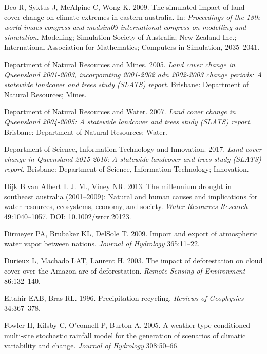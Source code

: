 \documentclass[fleqn,10pt,lineno]{wlpeerj} %
\theoremstyle{definition}
\theoremstyle{definition}
\theoremstyle{definition}
\theoremstyle{remark}
\begin{document}
\hypertarget{ref-Deo2009}{}
Deo R, Syktus J, McAlpine C, Wong K. 2009. The simulated impact of land
cover change on climate extremes in eastern australia. In:
\emph{Proceedings of the 18th world imacs congress and modsim09
international congress on modelling and simulation}. Modelling;
Simulation Society of Australia; New Zealand Inc.; International
Association for Mathematics; Computers in Simulation, 2035--2041.

\hypertarget{ref-SLATS2001}{}
Department of Natural Resources and Mines. 2005. \emph{Land cover change
in Queensland 2001-2003, incorporating 2001-2002 adn 2002-2003 change
periods: A statewide landcover and trees study (SLATS) report}.
Brisbane: Department of Natural Resources; Mines.

\hypertarget{ref-SLATS2004}{}
Department of Natural Resources and Water. 2007. \emph{Land cover change
in Queensland 2004-2005: A statewide landcover and trees study (SLATS)
report}. Brisbane: Department of Natural Resources; Water.

\hypertarget{ref-SLATS2017}{}
Department of Science, Information Technology and Innovation. 2017.
\emph{Land cover change in Queensland 2015-2016: A statewide landcover
and trees study (SLATS) report}. Brisbane: Department of Science,
Information Technology; Innovation.

\hypertarget{ref-vanDijk2013}{}
Dijk B van Albert I. J. M., Viney NR. 2013. The millennium drought in
southeast australia (2001--2009): Natural and human causes and
implications for water resources, ecosystems, economy, and society.
\emph{Water Resources Research} 49:1040--1057. DOI:
\href{https://doi.org/10.1002/wrcr.20123}{10.1002/wrcr.20123}.

\hypertarget{ref-Dirmeyer2009}{}
Dirmeyer PA, Brubaker KL, DelSole T. 2009. Import and export of
atmospheric water vapor between nations. \emph{Journal of Hydrology}
365:11--22.

\hypertarget{ref-Durieux2003}{}
Durieux L, Machado LAT, Laurent H. 2003. The impact of deforestation on
cloud cover over the Amazon arc of deforestation. \emph{Remote Sensing
of Environment} 86:132--140.

\hypertarget{ref-Eltahir1996}{}
Eltahir EAB, Bras RL. 1996. Precipitation recycling. \emph{Reviews of
Geophysics} 34:367--378.

\hypertarget{ref-Fowler2005}{}
Fowler H, Kilsby C, O'connell P, Burton A. 2005. A weather-type
conditioned multi-site stochastic rainfall model for the generation of
scenarios of climatic variability and change. \emph{Journal of
Hydrology} 308:50--66.
\end{document}
